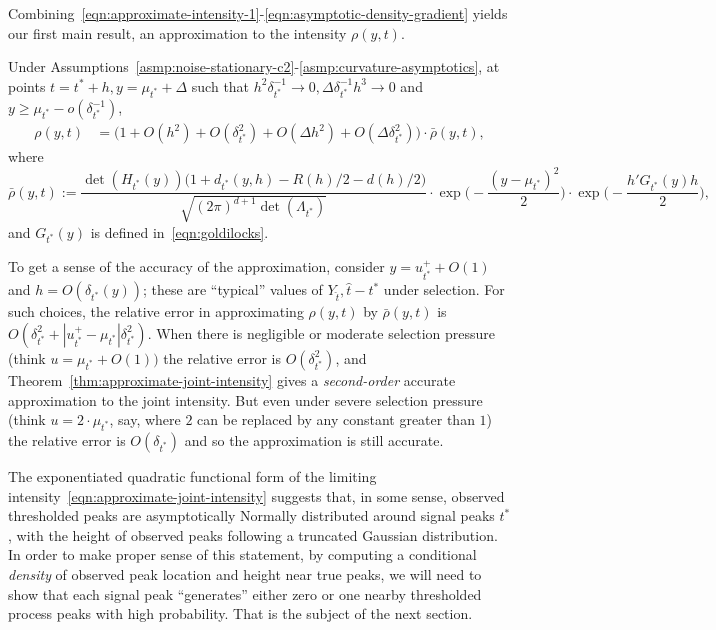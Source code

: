 \documentclass{article}
\newcommand{\ag}[1]{{\bf{{\red{[{AG: #1}]}}}}}
\begin{document}
	Combining~\eqref{eqn:approximate-intensity-1}-\eqref{eqn:asymptotic-density-gradient} yields our first main result, an approximation to the intensity $\rho(y,t)$.
	\begin{theorem}
		\label{thm:approximate-joint-intensity}
		Under Assumptions~\ref{asmp:noise-stationary-c2}-\ref{asmp:curvature-asymptotics}, at points $t = t^{\ast} + h, y = \mu_{t^*} + \Delta$ such that $h^2 \delta_{t^*}^{-1} \to 0, \Delta \delta_{t^*}^{-1}h^3 \to 0$ and $y \geq \mu_{t^*} - o(\delta_{t^*}^{-1})$,
		\begin{align*}
			\rho(y,t) & = \Big(1 + O(h^2) + O(\delta_{t^*}^2) + O(\Delta h^2) + O(\Delta\delta_{t^*}^2)\Big)\cdot\bar{\rho}(y,t),
		\end{align*}
		where
		\begin{equation}
			\label{eqn:approximate-joint-intensity}
			\bar{\rho}(y,t) := \frac{\det(H_{t^*}(y))\Big(1 + d_{t^*}(y,h) - R(h)/2 - d(h)/2\Big)}{\sqrt{(2\pi)^{d + 1}\det(\Lambda_{t^*})}}\cdot\exp\Big(-\frac{(y - \mu_{t^*})^2}{2}\Big) \cdot \exp\bigg(-\frac{h' G_{t^*}(y)h}{2}\bigg),
		\end{equation}
		and $G_{t^*}(y)$ is defined in~\eqref{eqn:goldilocks}.
	\end{theorem}
	To get a sense of the accuracy of the approximation, consider $y = u_{t^*}^{+} + O(1)$ and $h = O(\delta_{t^*}(y))$; these are ``typical'' values of $Y_{\hat{t}},\hat{t} - t^*$ under selection. For such choices, the relative error in approximating $\rho(y,t)$ by $\bar{\rho}(y,t)$ is $O(\delta_{t^*}^2 + |u_{t^*}^{+} - \mu_{t^*}| \delta_{t^*}^2)$. When there is negligible or moderate selection pressure (think $u = \mu_{t^*} + O(1))$ the relative error is $O(\delta_{t^*}^2)$, and Theorem~\ref{thm:approximate-joint-intensity} gives a \emph{second-order} accurate approximation to the joint intensity. But even under severe selection pressure (think $u = 2\cdot \mu_{t^*}$, say, where $2$ can be replaced by any constant greater than $1$) the relative error is $O(\delta_{t^*})$ and so the approximation is still accurate.
	
	
	The exponentiated quadratic functional form of the limiting intensity~\eqref{eqn:approximate-joint-intensity} suggests that, in some sense, observed thresholded peaks are asymptotically Normally distributed around signal peaks $t^{\ast}$, with the height of observed peaks following a truncated Gaussian distribution. In order to make proper sense of this statement, by computing a conditional \emph{density} of observed peak location and height near true peaks, we will need to show that each signal peak ``generates'' either zero or one nearby thresholded process peaks with high probability. That is the subject of the next section.
	
\end{document}
